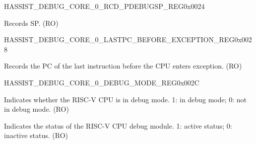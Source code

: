 \begin{register}{H}{ASSIST\_DEBUG\_CORE\_0\_RCD\_PDEBUGSP\_REG}{0x0024}\label{regdesc:ASSISTDEBUGCORE0RCDPDEBUGSPREG}
%
\regnewline%
\begin{regdesc}\begin{reglist}
\label{fielddesc:ASSISTDEBUGCORE0RCDPDEBUGSP}\item [ASSIST\_DEBUG\_CORE\_0\_RCD\_PDEBUGSP] Records SP. (RO)
\end{reglist}\end{regdesc}
\end{register}


\begin{register}{H}{ASSIST\_DEBUG\_CORE\_0\_LASTPC\_BEFORE\_EXCEPTION\_REG}{0x0028}\label{regdesc:ASSISTDEBUGCORE0LASTPCBEFOREEXCEPTIONREG}
%
\regnewline%
\begin{regdesc}\begin{reglist}
\label{fielddesc:ASSISTDEBUGCORE0LASTPCBEFOREEXC}\item [ASSIST\_DEBUG\_CORE\_0\_LASTPC\_BEFORE\_EXC] Records the PC of the last instruction before the CPU enters exception. (RO)
\end{reglist}\end{regdesc}
\end{register}


\begin{register}{H}{ASSIST\_DEBUG\_CORE\_0\_DEBUG\_MODE\_REG}{0x002C}\label{regdesc:ASSISTDEBUGCORE0DEBUGMODEREG}
%
%
%
\regnewline%
\begin{regdesc}\begin{reglist}
\label{fielddesc:ASSISTDEBUGCORE0DEBUGMODE}\item [ASSIST\_DEBUG\_CORE\_0\_DEBUG\_MODE] Indicates whether the RISC-V CPU is in debug mode. 1: in debug mode; 0: not in debug mode. (RO)
\label{fielddesc:ASSISTDEBUGCORE0DEBUGMODULEACTIVE}\item [ASSIST\_DEBUG\_CORE\_0\_DEBUG\_MODULE\_ACTIVE] Indicates the status of the RISC-V CPU debug module. 1: active status; 0: inactive status. (RO)
\end{reglist}\end{regdesc}
\end{register}


